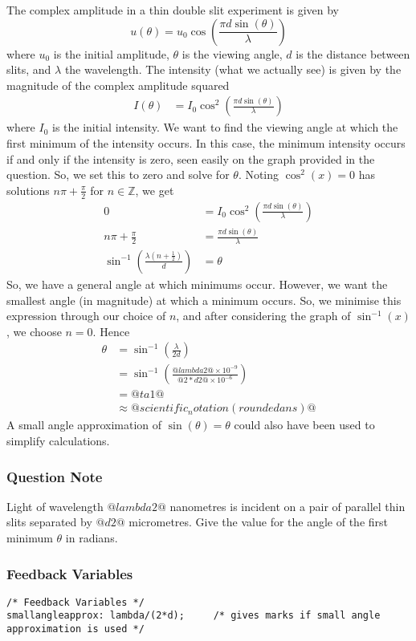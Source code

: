 \documentclass[a4paper,10pt]{article}
\begin{document}
The complex amplitude in a thin double slit experiment is given by \[ u(\theta) = u_0 \cos\left(\frac{\pi d \sin(\theta)}{\lambda}\right) \] where \(u_0\) is the initial amplitude, \(\theta\) is the viewing angle, \(d\) is the distance between slits, and \(\lambda\) the wavelength. The intensity (what we actually see) is given by the magnitude of the complex amplitude squared \begin{align*} I(\theta) &= I_0\cos^2\left(\frac{ \pi d \sin(\theta)}{\lambda} \right) \end{align*} where \(I_0\) is the initial intensity. We want to find the viewing angle at which the first minimum of the intensity occurs. In this case, the minimum intensity occurs if and only if the intensity is zero, seen easily on the graph provided in the question. So, we set this to zero and solve for \(\theta\). Noting \(\cos^2(x) = 0\) has solutions \(n\pi + \frac{\pi}{2}\) for \(n \in \mathbb{Z}\), we get \begin{align*} 0 &= I_0\cos^2\left(\frac{ \pi d \sin(\theta)}{\lambda} \right) \\ n\pi + \frac{\pi}{2} &= \frac{ \pi d \sin(\theta)}{\lambda} \\ \sin^{-1}\left( \frac{\lambda (n+\frac{1}{2})}{d} \right) &= \theta \end{align*} So, we have a general angle at which minimums occur. However, we want the smallest angle (in magnitude) at which a minimum occurs. So, we minimise this expression through our choice of \(n\), and after considering the graph of \(\sin^{-1}(x)\), we choose \(n=0\). Hence \begin{align*} \theta &= \sin^{-1}\left( \frac{\lambda}{2d} \right) \\ &= \sin^{-1}\left( \frac{@lambda2@ \times 10^{-9}}{@2*d2@\times 10^{-6}} \right) \\ &= @ta1@ \\  &\approx @scientific_notation(roundedans)@ \end{align*} A small angle approximation of \(\sin(\theta) = \theta\) could also have been used to simplify calculations.
\subsubsection{Question Note}
Light of wavelength \(@lambda2@\) nanometres is incident on a pair of parallel thin slits separated by \(@d2@\) micrometres. Give the value for the angle of the first minimum \(\theta\) in radians.
\subsubsection{Feedback Variables}
\begin{lstlisting}
/* Feedback Variables */
smallangleapprox: lambda/(2*d);     /* gives marks if small angle approximation is used */
\end{lstlisting}
\end{document}
